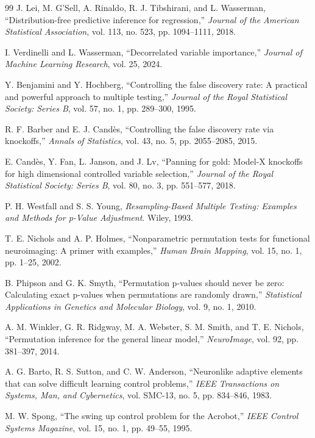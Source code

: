 \documentclass[11pt, a4paper, oneside,enumerate,textcomp]{report}
\begin{document}
\begin{thebibliography}{99}
J. Lei, M. G'Sell, A. Rinaldo, R. J. Tibshirani, and L. Wasserman, ``Distribution-free predictive inference for regression,'' \emph{Journal of the American Statistical Association}, vol. 113, no. 523, pp. 1094--1111, 2018.

I. Verdinelli and L. Wasserman, ``Decorrelated variable importance,'' \emph{Journal of Machine Learning Research}, vol. 25, 2024.

Y. Benjamini and Y. Hochberg, ``Controlling the false discovery rate: A practical and powerful approach to multiple testing,'' \emph{Journal of the Royal Statistical Society: Series B}, vol. 57, no. 1, pp. 289--300, 1995.

R. F. Barber and E. J. Cand\`es, ``Controlling the false discovery rate via knockoffs,'' \emph{Annals of Statistics}, vol. 43, no. 5, pp. 2055--2085, 2015.

E. Cand\`es, Y. Fan, L. Janson, and J. Lv, ``Panning for gold: Model-X knockoffs for high dimensional controlled variable selection,'' \emph{Journal of the Royal Statistical Society: Series B}, vol. 80, no. 3, pp. 551--577, 2018.

P. H. Westfall and S. S. Young, \emph{Resampling-Based Multiple Testing: Examples and Methods for p-Value Adjustment}. Wiley, 1993.

T. E. Nichols and A. P. Holmes, ``Nonparametric permutation tests for functional neuroimaging: A primer with examples,'' \emph{Human Brain Mapping}, vol. 15, no. 1, pp. 1--25, 2002.

B. Phipson and G. K. Smyth, ``Permutation p-values should never be zero: Calculating exact p-values when permutations are randomly drawn,'' \emph{Statistical Applications in Genetics and Molecular Biology}, vol. 9, no. 1, 2010.

A. M. Winkler, G. R. Ridgway, M. A. Webster, S. M. Smith, and T. E. Nichols, ``Permutation inference for the general linear model,'' \emph{NeuroImage}, vol. 92, pp. 381--397, 2014.

A. G. Barto, R. S. Sutton, and C. W. Anderson, ``Neuronlike adaptive elements that can solve difficult learning control problems,'' \emph{IEEE Transactions on Systems, Man, and Cybernetics}, vol. SMC-13, no. 5, pp. 834--846, 1983.

M. W. Spong, ``The swing up control problem for the Acrobot,'' \emph{IEEE Control Systems Magazine}, vol. 15, no. 1, pp. 49--55, 1995.

\end{thebibliography}
\end{document}
